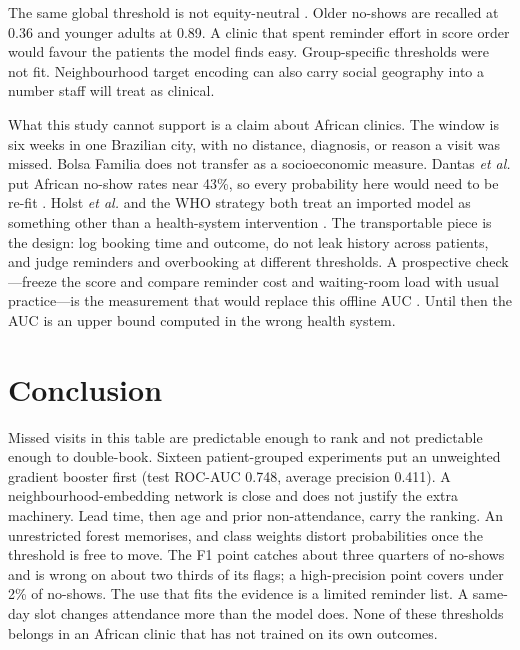 \documentclass[journal]{IEEEtran}
\begin{document}
The same global threshold is not equity-neutral \cite{rajkomar2018}. Older no-shows are recalled at 0.36 and younger adults at 0.89. A clinic that spent reminder effort in score order would favour the patients the model finds easy. Group-specific thresholds were not fit. Neighbourhood target encoding can also carry social geography into a number staff will treat as clinical.

What this study cannot support is a claim about African clinics. The window is six weeks in one Brazilian city, with no distance, diagnosis, or reason a visit was missed. Bolsa Familia does not transfer as a socioeconomic measure. Dantas \emph{et al.} put African no-show rates near 43\%, so every probability here would need to be re-fit \cite{dantas2018}. Holst \emph{et al.} and the WHO strategy both treat an imported model as something other than a health-system intervention \cite{holst2020,who2021}. The transportable piece is the design: log booking time and outcome, do not leak history across patients, and judge reminders and overbooking at different thresholds. A prospective check---freeze the score and compare reminder cost and waiting-room load with usual practice---is the measurement that would replace this offline AUC \cite{huang2014,thomas2017}. Until then the AUC is an upper bound computed in the wrong health system.

\section{Conclusion}
Missed visits in this table are predictable enough to rank and not predictable enough to double-book. Sixteen patient-grouped experiments put an unweighted gradient booster first (test ROC-AUC 0.748, average precision 0.411). A neighbourhood-embedding network is close and does not justify the extra machinery. Lead time, then age and prior non-attendance, carry the ranking. An unrestricted forest memorises, and class weights distort probabilities once the threshold is free to move. The F1 point catches about three quarters of no-shows and is wrong on about two thirds of its flags; a high-precision point covers under 2\% of no-shows. The use that fits the evidence is a limited reminder list. A same-day slot changes attendance more than the model does. None of these thresholds belongs in an African clinic that has not trained on its own outcomes.
\end{document}
